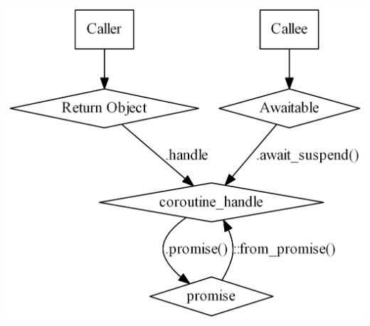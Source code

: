 \documentclass[aspectratio=169]{beamer}
\begin{document}
\begin{frame}
\vspace{20pt}

\begin{center}
  \includegraphics[height=.6\textheight]{pipelinesgfx/acquaintances03.png}
\end{center}

\end{frame}
\end{document}
